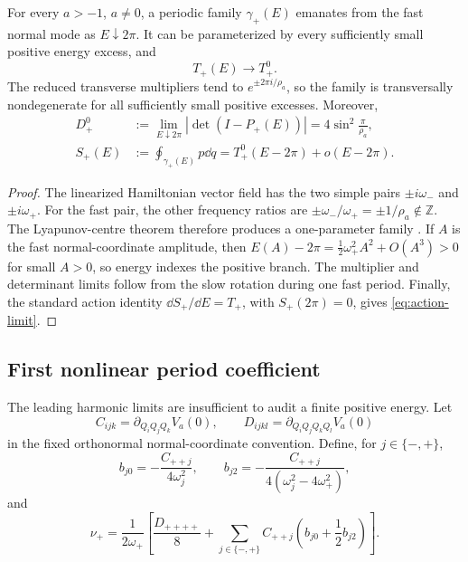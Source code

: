 \begin{proposition}
\label{prop:lyapunov-branch}
For every \(a>-1\), \(a\ne0\), a periodic family
\(\gamma_+(E)\) emanates from the fast normal mode as \(E\downarrow2\pi\).
It can be parameterized by every sufficiently small positive energy excess,
and
\begin{equation}
 T_+(E)\longrightarrow T_+^0.
 \label{eq:period-limit}
\end{equation}
The reduced transverse multipliers tend to
\(e^{\pm2\pi i/\rho_a}\), so the family is transversally nondegenerate for
all sufficiently small positive excesses.  Moreover,
\begin{align}
 D_+^0
 &:=\lim_{E\downarrow2\pi}|\det(I-P_+(E))|
 =4\sin^2\frac{\pi}{\rho_a},
 \label{eq:det-limit}\\
 S_+(E)
 &:=\oint_{\gamma_+(E)}p\dd q
 =T_+^0(E-2\pi)+o(E-2\pi).
 \label{eq:action-limit}
\end{align}
\end{proposition}

\begin{proof}
The linearized Hamiltonian vector field has the two simple pairs
\(\pm i\omega_-\) and \(\pm i\omega_+\).  For the fast pair, the other
frequency ratios are
\(\pm\omega_-/\omega_+=\pm1/\rho_a\notin\mathbb Z\).  The
Lyapunov-centre theorem therefore produces a one-parameter family
\citep{AlligoodYorke1986,Weinstein1973}.  If \(A\) is the fast
normal-coordinate amplitude, then
\(E(A)-2\pi=\tfrac12\omega_+^2A^2+O(A^3)>0\) for small \(A>0\), so energy
indexes the positive branch.  The multiplier and determinant limits follow
from the slow rotation during one fast period.  Finally, the standard action
identity \(\dd S_+/\dd E=T_+\), with \(S_+(2\pi)=0\), gives
\cref{eq:action-limit}.
\end{proof}

\subsection{First nonlinear period coefficient}

The leading harmonic limits are insufficient to audit a finite positive
energy.  Let
\begin{equation}
 C_{ijk}=\partial_{Q_iQ_jQ_k}V_a(0),
 \qquad
 D_{ijkl}=\partial_{Q_iQ_jQ_kQ_l}V_a(0)
 \label{eq:tensors}
\end{equation}
in the fixed orthonormal normal-coordinate convention.  Define, for
\(j\in\{-,+\}\),
\begin{equation}
 b_{j0}=-\frac{C_{++j}}{4\omega_j^2},
 \qquad
 b_{j2}=-\frac{C_{++j}}{4(\omega_j^2-4\omega_+^2)},
 \label{eq:b-coefficients}
\end{equation}
and
\begin{equation}
 \nu_+=\frac{1}{2\omega_+}
 \left[
 \frac{D_{++++}}{8}
 +\sum_{j\in\{-,+\}}C_{++j}
 \left(b_{j0}+\frac12b_{j2}\right)
 \right].
 \label{eq:nu-plus}
\end{equation}

